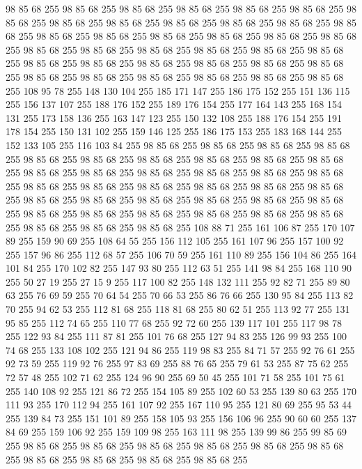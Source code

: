 98 85 68 255 98 85 68 255 98 85 68 255 98 85 68 255 98 85 68 255 98 85 68 255 98 85 68 255 98 85 68 255 98 85 68 255 98 85 68 255 98 85 68 255 98 85 68 255 98 85 68 255 98 85 68 255 98 85 68 255 98 85 68 255 98 85 68 255 98 85 68 255 98 85 68 255 98 85 68 255 98 85 68 255 98 85 68 255 98 85 68 255 98 85 68 255 98 85 68 255 98 85 68 255 98 85 68 255 98 85 68 255 98 85 68 255 98 85 68 255 98 85 68 255 98 85 68 255 98 85 68 255 98 85 68 255 98 85 68 255 98 85 68 255 98 85 68 255 108 95 78 255 148 130 104 255 185 171 147 255 186 175 152 255 151 136 115 255 156 137 107 255 188 176 152 255 189 176 154 255 177 164 143 255 168 154 131 255 173 158 136 255 163 147 123 255 150 132 108 255 188 176 154 255 191 178 154 255 150 131 102 255 159 146 125 255 186 175 153 255 183 168 144 255 152 133 105 255 116 103 84 255 98 85 68 255 98 85 68 255 98 85 68 255 98 85 68 255 98 85 68 255 98 85 68 255
98 85 68 255 98 85 68 255 98 85 68 255 98 85 68 255 98 85 68 255 98 85 68 255 98 85 68 255 98 85 68 255 98 85 68 255 98 85 68 255 98 85 68 255 98 85 68 255 98 85 68 255 98 85 68 255 98 85 68 255 98 85 68 255 98 85 68 255 98 85 68 255 98 85 68 255 98 85 68 255 98 85 68 255 98 85 68 255 98 85 68 255 98 85 68 255 98 85 68 255 98 85 68 255 98 85 68 255 98 85 68 255 98 85 68 255 98 85 68 255 98 85 68 255 108 88 71 255 161 106 87 255 170 107 89 255 159 90 69 255 108 64 55 255 156 112 105 255 161 107 96 255 157 100 92 255 157 96 86 255 112 68 57 255 106 70 59 255 161 110 89 255 156 104 86 255 164 101 84 255 170 102 82 255 147 93 80 255 112 63 51 255 141 98 84 255 168 110 90 255 50 27 19 255 27 15 9 255 117 100 82 255 148 132 111 255 92 82 71 255 89 80 63 255 76 69 59 255 70 64 54 255 70 66 53 255 86 76 66 255 130 95 84 255 113 82 70 255 94 62 53 255 112 81 68 255
118 81 68 255 80 62 51 255 113 92 77 255 131 95 85 255 112 74 65 255 110 77 68 255 92 72 60 255 139 117 101 255 117 98 78 255 122 93 84 255 111 87 81 255 101 76 68 255 127 94 83 255 126 99 93 255 100 74 68 255 133 108 102 255 121 94 86 255 119 98 83 255 84 71 57 255 92 76 61 255 92 73 59 255 119 92 76 255 97 83 69 255 88 76 65 255 79 61 53 255 87 75 62 255 72 57 48 255 102 71 62 255 124 96 90 255 69 50 45 255 101 71 58 255 101 75 61 255 140 108 92 255 121 86 72 255 154 105 89 255 102 60 53 255 139 80 63 255 170 111 93 255 170 112 94 255 161 107 92 255 167 110 95 255 121 80 69 255 95 53 44 255 139 84 73 255 151 101 89 255 158 105 93 255 156 106 96 255 90 60 60 255 137 84 69 255 159 106 92 255 159 109 98 255 163 111 98 255 139 99 86 255 99 85 69 255 98 85 68 255 98 85 68 255 98 85 68 255 98 85 68 255 98 85 68 255 98 85 68 255 98 85 68 255 98 85 68 255 98 85 68 255 98 85 68 255
